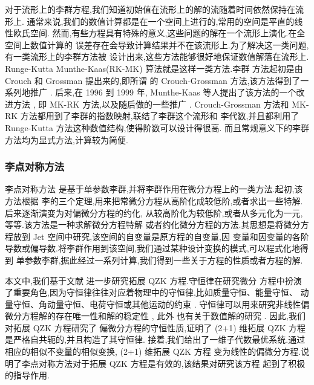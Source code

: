 对于流形上的李群方程,我们知道初始值在流形上的解的流随着时间依然保持在流形上.
通常来说,我们的数值计算都是在一个空间上进行的,常用的空间是平直的线性欧氏空间.
然而,有些方程具有特殊的意义,这些问题的解在一个流形上演化.在全空间上数值计算的
误差存在会导致计算结果并不在该流形上.为了解决这一类问题,有一类流形上的李群方法被
设计出来,这些方法能够很好地保证数值解落在流形上. Runge-Kutta Munthe-Kaas(RK-MK) 算法就是这样一类方法.李群
方法起初是由 Crouch 和 Grossman \cite{crouch1993numerical} 提出来的,即所谓
的 Crouch-Grossman 方法,该方法得到了一系列地推广
\cite{faleinsen2001multi,zaletkin2010numerical,bulychev2001numerical,buono2003numerical,billo1992numerical}.
后来,在 1996 到 1999 年, Munthe-Kaas  等人提出了该方法的一个改进方法
\cite{mk1996lie,mk1997numerical,mk1998runge,mk1999high}, 即 MK-RK 方法,以及随后做的一些推广 \cite{ostermann2010exponential,owren2000the,bruls2012lie,munthe2013onpost,garcla2011onalg}.
Crouch-Grossman 方法和 MK-RK 方法都用到了李群的指数映射,联结了李群这个流形和
李代数,并且都利用了 Runge-Kutta 方法这种数值结构,使得阶数可以设计得很高.
而且常规意义下的李群方法均为显式方法,计算较为简便.

\subsubsection*{\textbf{李点对称方法}}

李点对称方法 \cite{olver2000app} 是基于单参数李群,并将李群作用在微分方程上的一类方法.起初,该方法根据
李的三个定理,用来把常微分方程从高阶化成较低阶,或者求出一些特解.后来逐渐演变为对偏微分方程的约化,
从较高阶化为较低阶,或者从多元化为一元,等等.该方法是一种求解微分方程特解
或者约化微分方程的方法.其思想是将微分方程放到 Jet 空间中研究,该空间的自变量是原方程的自变量,因
变量和因变量的各阶导数或偏导数.将李群作用到该空间,我们通过某种设计变换的模式,可以程式化地得到
单参数李群,据此经过一系列计算,我们得到一些关于方程的性质或者方程的解.

本文中,我们基于文献 \cite{sjoberg2007dou} 进一步研究拓展 QZK 方程.守恒律在研究微分
方程中扮演了重要角色,因为守恒律往往对应着物理中的守恒律,比如质量守恒、能量守恒、
动量守恒、角动量守恒、电荷守恒或其他运动的约束 \cite{mushtaq2005non,song2013top,song2013dom}.
守恒律可以用来研究非线性偏微分方程解的存在唯一性和解的稳定性 \cite{wang2014soli}, 此外
也有关于数值解的研究 \cite{wazwaz2005exact,wazwaz2008the}. 因此,我们对拓展 QZK 方程研究了
偏微分方程的守恒性质,证明了 (2+1) 维拓展 QZK 方程是严格自共轭的,并且构造了其守恒律.
接着,我们给出了一维子代数最优系统.通过相应的相似不变量的相似变换, (2+1) 维拓展 QZK 方程
变为线性的偏微分方程.说明了李点对称方法对于拓展 QZK 方程是有效的,该结果对研究该方程
起到了积极的指导作用.


